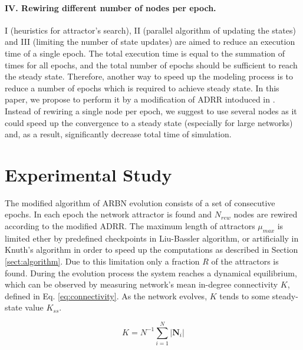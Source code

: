 \documentclass[procedia]{easychair}
\begin{document}
	\paragraph{IV. Rewiring different number of nodes per epoch.} I (heuristics for attractor's search), II (parallel algorithm of updating the states) and III (limiting the number of state updates) are aimed to reduce an execution time of a single epoch. The total execution time is equal to the summation of times for all epochs, and the total number of epochs should be sufficient to reach the steady state. Therefore, another way to speed up the modeling process is to reduce a number of epochs which is required to achieve steady state. In this paper, we propose to perform it by a modification of ADRR intoduced in \cite{mlb}. Instead of rewiring a single node per epoch, we suggest to use several nodes as it could speed up the convergence to a steady state (especially for large networks) and, as a result, significantly decrease total time of simulation.
	

	
	\section{Experimental Study}
	\label{sect:experimental-study}
	
The modified algorithm of ARBN evolution consists of a set of consecutive epochs. In each epoch the network attractor is found and $N_{rew}$ nodes are rewired according to the modified ADRR. The maximum length of attractors $\mu_{max}$ is limited ether by predefined checkpoints in Liu-Bassler algorithm, or artificially in Knuth's algorithm in order to speed up the computations as described in Section \ref{sect:algorithm}. Due to this limitation only a fraction $R$ of the attractors is found. During the evolution process the system reaches a dynamical equilibrium, which can be observed by measuring network's mean in-degree connectivity $K$, defined in Eq. \ref{eq:connectivity}. As the network evolves, $K$ tends to some steady-state value $K_{ss}$.
	
	
	\begin{equation}
	\label{eq:connectivity}
		K = N^{-1} \sum_{i=1}^{N} {|\mathbf{N}_i|}
	\end{equation}
	
\end{document}

